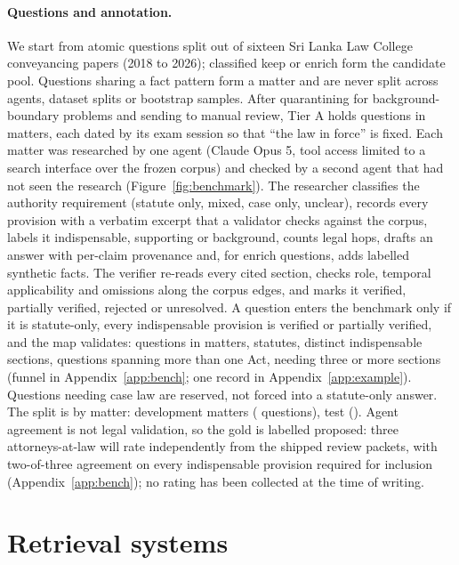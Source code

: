 \documentclass{article}
\begin{document}
\paragraph{Questions and annotation.} We start from \nSourceQ{} atomic
questions split out of sixteen Sri Lanka Law College conveyancing papers (2018
to 2026); \nCandidates{} classified keep or enrich form the candidate pool.
Questions sharing a fact pattern form a matter and are never split across
agents, dataset splits or bootstrap samples. After quarantining
\nQuarantined{} for background-boundary problems and sending \nTierB{} to
manual review, Tier A holds \nTierA{} questions in \nTierAMatters{} matters,
each dated by its exam session so that ``the law in force'' is fixed. Each
matter was researched by one agent (Claude Opus 5, tool access limited to a
search interface over the frozen corpus) and checked by a second agent that
had not seen the research (Figure~\ref{fig:benchmark}). The researcher
classifies the authority requirement (statute only, mixed, case only,
unclear), records every provision with a verbatim excerpt that a validator
checks against the corpus, labels it indispensable, supporting or background,
counts legal hops, drafts an answer with per-claim provenance and, for enrich
questions, adds labelled synthetic facts. The verifier re-reads every cited
section, checks role, temporal applicability and omissions along the corpus
edges, and marks it verified, partially verified, rejected or unresolved. A
question enters the benchmark only if it is
statute-only, every indispensable provision is verified or partially verified,
and the map validates: \nGoldQ{} questions in \nGoldM{} matters, \nGoldActs{}
statutes, \nGoldIndSecs{} distinct indispensable sections, \nMultiAct{}
questions spanning more than one Act, \indThreePlus{} needing three or more
sections (funnel in Appendix~\ref{app:bench}; one record in
Appendix~\ref{app:example}). Questions needing case law are reserved, not
forced into a statute-only answer. The split is by matter: development
\nDevM{} matters (\nDevQ{} questions), test \nTestM{} (\nTestQ{}). Agent
agreement is not legal validation, so the gold is labelled proposed: three
attorneys-at-law will rate independently from the shipped review packets, with
two-of-three agreement on every indispensable provision required for inclusion
(Appendix~\ref{app:bench}); no rating has been collected at the time of
writing.

\section{Retrieval systems}
\label{sec:method}
\end{document}
